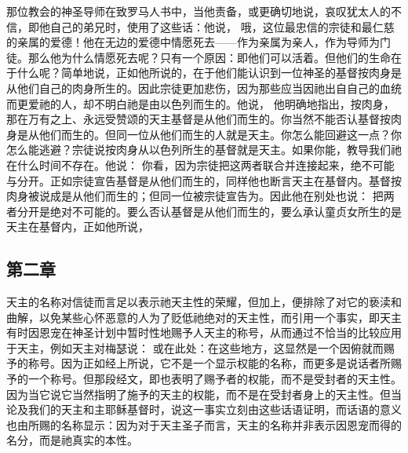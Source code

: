 \par

那位教会的神圣导师在致罗马人书中，当他责备，或更确切地说，哀叹犹太人的不信，即他自己的弟兄时，使用了这些话：他说，  哦，这位最忠信的宗徒和最仁慈的亲属的爱德！他在无边的爱德中情愿死去——作为亲属为亲人，作为导师为门徒。那么他为什么情愿死去呢？只有一个原因：即他们可以活着。但他们的生命在于什么呢？简单地说，正如他所说的，在于他们能认识到一位神圣的基督按肉身是从他们自己的肉身所生的。因此宗徒更加悲伤，因为那些应当因祂出自自己的血统而更爱祂的人，却不明白祂是由以色列而生的。他说， 他明确地指出，按肉身，那在万有之上、永远受赞颂的天主基督是从他们而生的。你当然不能否认基督按肉身是从他们而生的。但同一位从他们而生的人就是天主。你怎么能回避这一点？你怎么能逃避？宗徒说按肉身从以色列所生的基督就是天主。如果你能，教导我们祂在什么时间不存在。他说： 你看，因为宗徒把这两者联合并连接起来，绝不可能与分开。正如宗徒宣告基督是从他们而生的，同样他也断言天主在基督内。基督按肉身被说成是从他们而生的；但同一位被宗徒宣告为。因此他在别处也说：  把两者分开是绝对不可能的。要么否认基督是从他们而生的，要么承认童贞女所生的是天主在基督内，正如他所说，\par


\subsection{第二章}

\par

天主的名称对信徒而言足以表示祂天主性的荣耀，但加上，便排除了对它的亵渎和曲解，以免某些心怀恶意的人为了贬低祂绝对的天主性，而引用一个事实，即天主有时因恩宠在神圣计划中暂时性地赐予人天主的称号，从而通过不恰当的比较应用于天主，例如天主对梅瑟说： 或在此处：在这些地方，这显然是一个因俯就而赐予的称号。因为正如经上所说，它不是一个显示权能的名称，而更多是说话者所赐予的一个称号。但那段经文，即也表明了赐予者的权能，而不是受封者的天主性。因为当它说它当然指明了施予的天主的权能，而不是在受封者身上的天主性。但当论及我们的天主和主耶稣基督时，说这一事实立刻由这些话语证明，而话语的意义也由所赐的名称显示：因为对于天主圣子而言，天主的名称并非表示因恩宠而得的名分，而是祂真实的本性。\par

